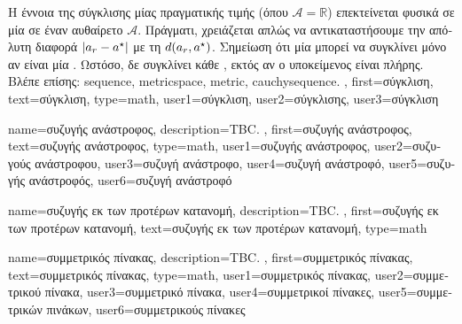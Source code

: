 {{		\foreignlanguage{greek}{Η έννοια της σύγκλισης μίας}  
		\foreignlanguage{greek}{πραγματικής τιμής (όπου $\mathcal{A}=\mathbb{R}$) επεκτείνεται φυσικά σε μία} 
		 \foreignlanguage{greek}{σε έναν αυθαίρετο}
		 $\mathcal{A}$. \foreignlanguage{greek}{Πράγματι, χρειάζεται απλώς να 
		αντικαταστήσουμε την απόλυτη διαφορά $|a_{r} - a^\star|$ με τη}
		 $d(a_{r},a^\star)$. 
		\foreignlanguage{greek}{Σημείωση ότι μία}  \foreignlanguage{greek}{μπορεί να 
		συγκλίνει μόνο αν είναι μία}  \cite{RudinBookPrinciplesMatheAnalysis}. 
		\foreignlanguage{greek}{Ωστόσο, δε συγκλίνει κάθε} , 
		\foreignlanguage{greek}{εκτός αν ο υποκείμενος}  \foreignlanguage{greek}{είναι πλήρης}. 
		\\
		\foreignlanguage{greek}{Βλέπε επίσης:} \gls{sequence}, \gls{metricspace}, \gls{metric}, \gls{cauchysequence}. },
	first={\foreignlanguage{greek}{σύγκλιση}},
	text={\foreignlanguage{greek}{σύγκλιση}},
	type=math, 
	user1={\foreignlanguage{greek}{σύγκλιση}}, %
	user2={\foreignlanguage{greek}{σύγκλισης}}, %
	user3={\foreignlanguage{greek}{σύγκλιση}} %
}

{name={\foreignlanguage{greek}{συζυγής ανάστροφος}},
	description={TBC. },
 	first={\foreignlanguage{greek}{συζυγής ανάστροφος}},
 	text={\foreignlanguage{greek}{συζυγής ανάστροφος}},
	type=math,
	user1={\foreignlanguage{greek}{συζυγής ανάστροφος}}, %
 	user2={\foreignlanguage{greek}{συζυγούς ανάστροφου}}, %
	user3={\foreignlanguage{greek}{συζυγή ανάστροφο}}, %
	user4={\foreignlanguage{greek}{συζυγή ανάστροφό}}, %
	user5={\foreignlanguage{greek}{συζυγής ανάστροφός}}, %
	user6={\foreignlanguage{greek}{συζυγή ανάστροφό}} %
}

 {name={\foreignlanguage{greek}{συζυγής εκ των προτέρων κατανομή}},
 	description={TBC. },
 	first={\foreignlanguage{greek}{συζυγής εκ των προτέρων κατανομή}},
 	text={\foreignlanguage{greek}{συζυγής εκ των προτέρων κατανομή}},
	type=math
}

{name={\foreignlanguage{greek}{συμμετρικός πίνακας}},
	description={TBC. },
	first={\foreignlanguage{greek}{συμμετρικός πίνακας}},
	text={\foreignlanguage{greek}{συμμετρικός πίνακας}},
	type=math, 
	user1={\foreignlanguage{greek}{συμμετρικός πίνακας}}, %
	user2={\foreignlanguage{greek}{συμμετρικού πίνακα}}, %
	user3={\foreignlanguage{greek}{συμμετρικό πίνακα}}, %
	user4={\foreignlanguage{greek}{συμμετρικοί πίνακες}}, %
	user5={\foreignlanguage{greek}{συμμετρικών πινάκων}}, %
	user6={\foreignlanguage{greek}{συμμετρικούς πίνακες}} %
}

